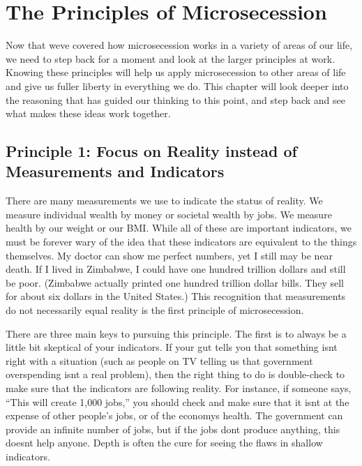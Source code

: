 
\chapter{The Principles of Microsecession}


Now that we{\textquotesingle}ve covered how microsecession works in a
variety of areas of our life, we need to step back for a moment and
look at the larger principles at work. Knowing these principles will
help us apply microsecession to other areas of life and give us fuller
liberty in everything we do.  This chapter will look deeper into the
reasoning that has guided our thinking to this point, and step back and
see what makes these ideas work together.

\section{Principle 1: Focus on Reality instead of Measurements and
Indicators}

There are many measurements we use to indicate the status of reality. We
measure individual wealth by money or societal wealth by jobs. We
measure health by our weight
or our BMI. While all
of these are important indicators, we must be forever wary
of the idea that
these indicators are equivalent to the things themselves. My doctor can
show me perfect numbers, yet I still may be near death. If I lived in
Zimbabwe, I could have one hundred trillion dollars and still be poor.
(Zimbabwe actually printed one hundred trillion dollar bills. They sell
for about six dollars in the United States.)
This recognition that
measurements do not necessarily equal reality is the first principle of
microsecession.


There are three main keys to pursuing this principle. The first is to
always be a little bit skeptical of your indicators. If your gut tells
you that something isn{\textquotesingle}t right with a situation (such
as people on TV telling us that government overspending
isn{\textquotesingle}t a real problem), then the right thing to do is
double-check to make sure that the indicators are following reality.
For instance, if someone says, “This will create 1,000 jobs,” you
should check and make sure that it isn{\textquotesingle}t at the
expense of other people’s jobs, or of the economy{\textquotesingle}s
health. The government can provide an infinite number of jobs, but if
the jobs
don{\textquotesingle}t produce anything, this doesn{\textquotesingle}t
help anyone. Depth is often the cure for seeing the flaws in shallow
indicators.


